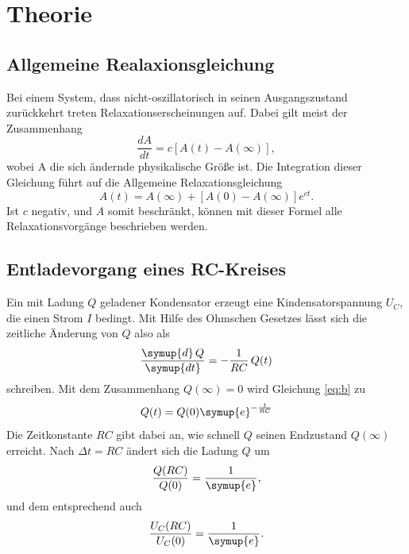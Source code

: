 \section{Theorie}
\label{sec:Theorie}
\subsection{Allgemeine Realaxionsgleichung}
Bei einem System, dass nicht-oszillatorisch in seinen
Ausgangszustand zurückkehrt treten Relaxationserscheinungen
auf. Dabei gilt meist der Zusammenhang
\begin{equation}
    \frac{dA}{dt}=c[A(t)-A(\infty)],
\end{equation}
\noindent wobei A die sich ändernde physikalische Größe ist.
Die Integration dieser Gleichung führt auf die Allgemeine
Relaxationsgleichung
\begin{equation}
    A(t)=A(\infty)+[A(0)-A(\infty)]e^{ct}.
    \label{eq:b}
\end{equation}
\noindent Ist $c$ negativ, und $A$ somit beschränkt,
können mit dieser Formel alle Relaxationsvorgänge beschrieben werden.



\subsection{Entladevorgang eines RC-Kreises}
Ein mit Ladung $Q$ geladener Kondensator erzeugt eine
Kindensatorspannung $U_C$, die einen Strom $I$ bedingt.
Mit Hilfe des Ohmschen Gesetzes lässt sich die
zeitliche Änderung von $Q$ also als
\begin{equation}
    \frac{{\symup{d}\,Q}}{\symup{dt}}=-\frac{1}{RC}\,Q(t)
\end{equation}
schreiben. Mit dem Zusammenhang $Q(\infty) =0$ wird
Gleichung \ref{eq:b} zu
\begin{equation}
    Q(t)=Q(0)\symup{e}^{-\frac{t}{RC}}
\label{eq:Auswertung1}
\end{equation}
\noindent Die Zeitkonstante $RC$ gibt dabei an, wie
schnell $Q$ seinen Endzustand $Q(\infty)$ erreicht.
Nach $\Delta t=RC$ ändert sich die Ladung $Q$ um
\begin{equation}
    \frac{Q(RC)}{Q(0)}=\frac{1}{\symup{e}},
\end{equation}
\noindent und dem entsprechend auch
\begin{equation}
    \frac{U_C(RC)}{U_C(0)}=\frac{1}{\symup{e}}.
\end{equation}



